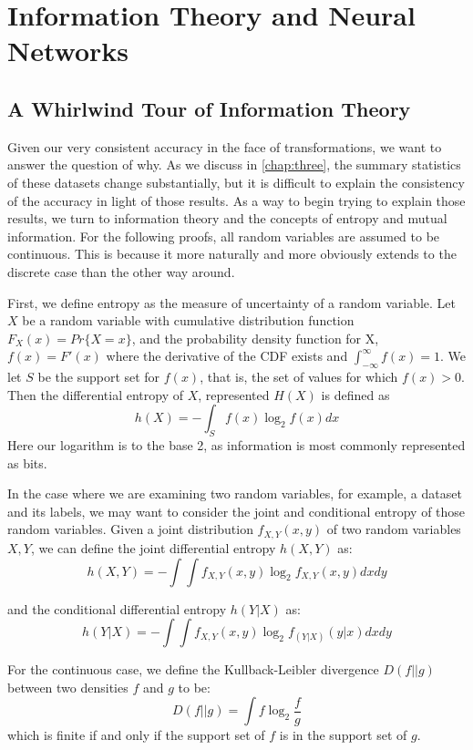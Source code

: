 \chapter{Information Theory and Neural Networks}
\label{chap:four}

\section{A Whirlwind Tour of Information Theory}
Given our very consistent accuracy in the face of transformations, we want to answer the question of why.
As we discuss in \ref{chap:three}, the summary statistics of these datasets change substantially, but it is difficult to explain the consistency of the accuracy in light of those results.
As a way to begin trying to explain those results, we turn to information theory and the concepts of entropy and mutual information.
For the following proofs, all random variables are assumed to be continuous. 
This is because it more naturally and more obviously extends to the discrete case than the other way around.

First, we define entropy as the measure of uncertainty of a random variable.
Let $X$ be a random variable with cumulative distribution function $F_X(x) = Pr\{X = x\}$, and the probability density function for X, $f(x) = F'(x)$ where the derivative of the CDF exists and $\int_{-\infty}^{\infty}f(x) = 1$.
We let $S$ be the support set for $f(x)$, that is, the set of values for which $f(x) > 0$.
Then the differential entropy of $X$, represented $H(X)$ is defined as
$$ h(X) = -\int_{S} f(x) \log_2 f(x) dx$$
Here our logarithm is to the base 2, as information is most commonly represented as bits. 

In the case where we are examining two random variables, for example, a dataset and its labels, we may want to consider the joint and conditional entropy of those random variables.
Given a joint distribution $f_{X,Y}(x, y)$ of two random variables $X, Y$, we can define the joint differential entropy $h(X, Y)$ as:
$$ h(X, Y) = - \int \int f_{X,Y}(x, y) \log_2 f_{X,Y}(x, y) dx dy$$

and the conditional differential entropy $h(Y | X)$ as:
$$ h(Y|X) = -\int \int f_{X,Y}(x, y) \log_2 f_{(Y|X)}(y|x) dx dy$$

For the continuous case, we define the Kullback-Leibler divergence $D(f||g)$ between two densities $f$ and $g$ to be:
$$D(f||g) = \int f \log_2 \frac{f}{g}$$
which is finite if and only if the support set of $f$ is in the support set of $g$.

